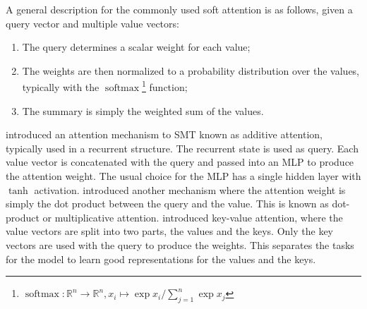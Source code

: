 \documentclass[11pt]{article}
\DeclareMathOperator{\softmax}{softmax}
\begin{document}
A general description for the commonly used soft attention is as follows,
given a query vector and multiple value vectors:

\begin{enumerate}
\item The query determines a scalar weight for each value;
\item The weights are then normalized to a probability distribution over the values, typically with
the \(\softmax\)\footnote{\(\softmax : \mathbb{R}^{n} \to \mathbb{R}^{n},
  x_{i} \mapsto \exp x_{i} / \sum_{j=1}^{n}{\exp x_{j}}\)} function;
\item The summary is simply the weighted sum of the values.
\end{enumerate}

\textcite{bahdanau2014neural} introduced an attention mechanism to SMT known as additive attention,
typically used in a recurrent structure.
The recurrent state is used as query.
Each value vector is concatenated with the query and passed into an MLP to produce the attention weight.
The usual choice for the MLP has a single hidden layer with \(\tanh\) activation.
\textcite{luong2015effective} introduced another mechanism where the attention weight is simply
the dot product between the query and the value.
This is known as dot-product or multiplicative attention.
\textcite{daniluk2017frustratingly} introduced key-value attention,
where the value vectors are split into two parts, the values and the keys.
Only the key vectors are used with the query to produce the weights.
This separates the tasks for the model to learn good representations for the values and the keys.
\end{document}
